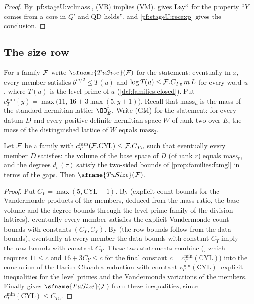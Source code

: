 \begin{proof}
By \cref{pf:stageU:volmass}, (VR) implies (VM).  gives $\mathrm{Lay}^{\mathrm g}$ for the property ``$Y$ comes
from a core in $Q'$ and $\mathrm{QD}$ holds'', and \cref{pf:stageU:recexp} gives the conclusion.
\end{proof}

\subsection{The size row}\label{sec:pf:stageU:size}

For a family $\mathcal{F}$ write $\sfname{TuSize}(\stageUFm)$ for the statement: eventually in $x$, every member satisfies
$b^{m/2}\le T(u)$ and $\log T(u)\le\mathcal{F}.C_{Tu}\,m\,L$ for every word $u$, where $T(u)$ is the level prime of $u$
(\cref{def:families:closed}). Put $c_T^{\min}(y)=\max\bigl(11,\,16+3\max(5,y+1)\bigr)$. Recall that $\mathrm{mass}_n$ is the
mass of the standard hermitian lattice $\OO_E^n$. Write (GM) for the statement: for every datum $D$ and every positive
definite hermitian space $W$ of rank two over $E$, the mass of the distinguished lattice of $W$ equals $\mathrm{mass}_2$.

\begin{lemma}\label{pf:stageU:tusizemin}
Let $\mathcal{F}$ be a family with $c_T^{\min}(\mathcal{F}.\mathrm{CYL})\le\mathcal{F}.C_{Tu}$ such that eventually every member $D$
satisfies: the volume of the base space of $D$ (of rank $r$) equals $\mathrm{mass}_r$, and the degrees $d_\sigma(\tau)$
satisfy the two-sided bounds of \cref{prop:families:famgl} in terms of the gaps. Then $\sfname{TuSize}(\stageUFm)$.
\end{lemma}

\begin{proof}
Put $C_Y=\max(5,\mathrm{CYL}+1)$. By 
(explicit count bounds for the Vandermonde products of the members, deduced from the mass ratio, the base volume and the
degree bounds through the level-prime family of the division lattices), eventually every member satisfies the explicit
Vandermonde count bounds with constants $(C_Y,C_Y)$. By 
(the row bounds follow from the data bounds), eventually at every member the data bounds with constant $C_Y$ imply the
row bounds with constant $C_Y$. These two statements combine
(, which requires $11\le c$ and $16+3C_Y\le c$
for the final constant $c=c_T^{\min}(\mathrm{CYL})$) into the conclusion of the Harish-Chandra reduction with constant
$c_T^{\min}(\mathrm{CYL})$: explicit inequalities for the level primes and the Vandermonde variations of the members.
Finally  gives $\sfname{TuSize}(\stageUFm)$ from these
inequalities, since $c_T^{\min}(\mathrm{CYL})\le C_{Tu}$.
\end{proof}

